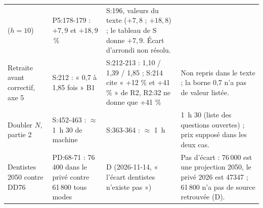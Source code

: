 {\begin{longtable}{@{}p{2.9cm}p{3.5cm}p{3.5cm}p{4.7cm}@{}}
  ($h = 10$) & P5:178-179 : $+7{,}9$ et $+18{,}9$\,\% & S:196, valeurs du texte ($+7{,}8$ ; $+18{,}8$) ; le tableau de
  S donne $+7{,}9$. Écart d'arrondi non résolu. \\
Retraite avant correctif, axe 5 & S:212 : « 0,7 à 1,85 fois » B1 & S:212-213 : 1,10 / 1,39 / 1,85 ; S:214 cite « +12
  \% et +41 \% » de R2, R2:32 ne donne que +41 \% & Non repris dans le texte ; la borne 0,7 n'a pas de valeur listée.
  \\
Doubler $N$, partie 2 & S:452-463 : $\approx$ 1~h 30 de machine & S:363-364 : $\approx$ 1~h & 1~h 30 (liste des
  questions ouvertes) ; prix supposé dans les deux cas. \\
Dentistes 2050 contre DD76 & PD:68-71 : 76\,400 dans le privé contre 61\,800 tous modes & D (2026-11-14,
  « l'écart dentistes n'existe pas ») & Pas d'écart : 76\,000 est une projection 2050, le privé 2026 est
  \num{47347} ; 61\,800 n'a pas de source retrouvée (D). \\
\end{longtable}
}
\endgroup
